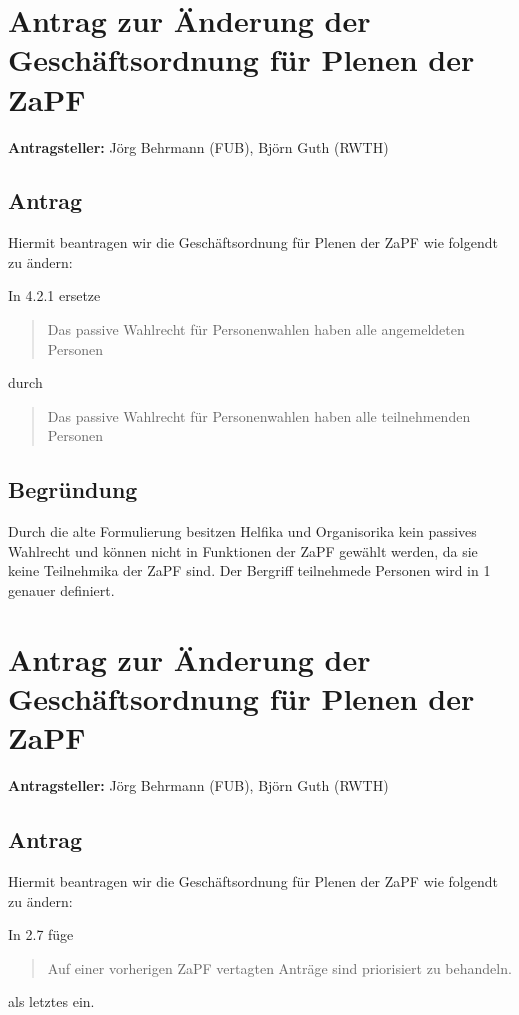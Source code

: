 \documentclass[draft,10pt,oneside]{scrartcl}
\begin{document}
\newpage

\section*{Antrag zur Änderung der Geschäftsordnung für Plenen der ZaPF}

\textbf{Antragsteller:} Jörg Behrmann (FUB), Björn Guth (RWTH)

\subsection*{Antrag}

Hiermit beantragen wir die Geschäftsordnung für Plenen der ZaPF wie folgendt zu ändern:

In 4.2.1 ersetze
\begin{quote}
	Das passive Wahlrecht für Personenwahlen haben alle angemeldeten Personen
\end{quote}
durch
\begin{quote}
	Das passive Wahlrecht für Personenwahlen haben alle teilnehmenden Personen
\end{quote}

\subsection*{Begründung}
Durch die alte Formulierung besitzen Helfika und Organisorika kein passives
Wahlrecht und können nicht in Funktionen der ZaPF gewählt werden, da sie keine
Teilnehmika der ZaPF sind. Der Bergriff \glqq{}teilnehmede Personen\grqq{} wird
in 1 genauer definiert.

\newpage

\section*{Antrag zur Änderung der Geschäftsordnung für Plenen der ZaPF}

\textbf{Antragsteller:} Jörg Behrmann (FUB), Björn Guth (RWTH)

\subsection*{Antrag}

Hiermit beantragen wir die Geschäftsordnung für Plenen der ZaPF wie folgendt zu ändern:

In 2.7 füge
\begin{quote}
	Auf einer vorherigen ZaPF vertagten Anträge sind priorisiert zu behandeln.
\end{quote}
als letztes ein.
\end{document}
